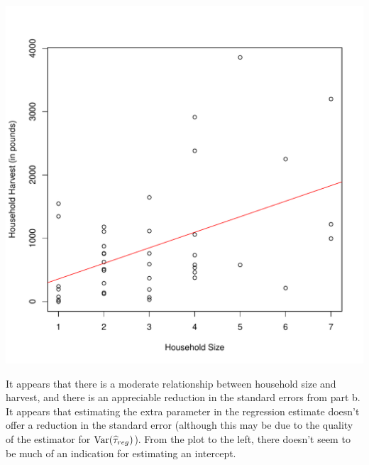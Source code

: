 \documentclass[usenames,dvipsnames]{homework}
\begin{document}
\begin{solution}
\begin{minipage}{.48\textwidth}
  \includegraphics[width=\textwidth]{harvest_ratio.pdf}
\end{minipage}
\begin{minipage}{.48\textwidth}
  It appears that there is a moderate relationship between household size and harvest, and there is an appreciable reduction in the standard errors from part b.  It appears that estimating the extra parameter in the regression estimate doesn't offer a reduction in the standard error (although this may be due to the quality of the estimator for $\mathrm{Var}(\widehat \tau_{reg})$). From the plot to the left, there doesn't seem to be much of an indication for estimating an intercept.
\end{minipage}
\end{solution}
\end{document}
